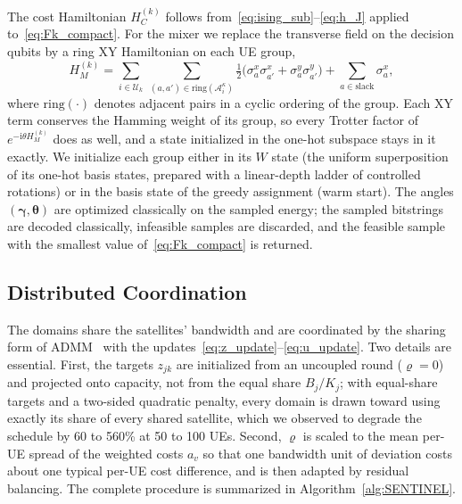 The cost Hamiltonian $H_C^{(k)}$ follows from~\eqref{eq:ising_sub}--\eqref{eq:h_J} applied to~\eqref{eq:Fk_compact}.
For the mixer we replace the transverse field on the decision qubits by a ring XY Hamiltonian on each UE group,
\begin{equation}
    H_{M}^{(k)}=\sum_{i\in\mathscr{U}_k}\ \sum_{(a,a')\in\mathrm{ring}(\mathscr{A}^{\kappa}_i)}
    \tfrac{1}{2}\bigl(\sigma^x_a\sigma^x_{a'}+\sigma^y_a\sigma^y_{a'}\bigr)
    +\sum_{a\in\text{slack}}\sigma^x_a ,
    \label{eq:HM_xy}
\end{equation}
where $\mathrm{ring}(\cdot)$ denotes adjacent pairs in a cyclic ordering of the group. Each XY term conserves the
Hamming weight of its group, so every Trotter factor of $e^{-\mathrm{i}\theta H_M^{(k)}}$ does as well, and a state
initialized in the one-hot subspace stays in it exactly. We initialize each group either in its $W$ state (the uniform
superposition of its one-hot basis states, prepared with a linear-depth ladder of controlled rotations) or in the
basis state of the greedy assignment (warm start). The angles $(\boldsymbol{\gamma},\boldsymbol{\theta})$ are
optimized classically on the sampled energy; the sampled bitstrings are decoded classically, infeasible samples are
discarded, and the feasible sample with the smallest value of~\eqref{eq:Fk_compact} is returned.

\subsection{Distributed Coordination}

The domains share the satellites' bandwidth and are coordinated by the sharing form of ADMM~\cite{Boyd2011} with the
updates~\eqref{eq:z_update}--\eqref{eq:u_update}. Two details are essential. First, the targets $z_{jk}$ are
initialized from an uncoupled round ($\varrho=0$) and projected onto capacity, not from the equal share $B_j/K_j$;
with equal-share targets and a two-sided quadratic penalty, every domain is drawn toward using exactly its share of
every shared satellite, which we observed to degrade the schedule by 60 to 560\% at 50 to 100 UEs. Second, $\varrho$ is
scaled to the mean per-UE spread of the weighted costs $a_v$ so that one bandwidth unit of deviation costs about one
typical per-UE cost difference, and is then adapted by residual balancing. The complete procedure is summarized in
Algorithm~\ref{alg:SENTINEL}. %

